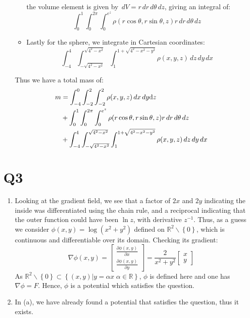 \documentclass[a4paper, 11pt]{article}
\newcommand{\RR}{\mathbb{R}}
\def\set#1{\left\{ #1 \right\}}
\begin{document}
\begin{enumerate}[label=(\alph*)]
\begin{itemize}
		            the volume element is given by $\,dV = r\,d r\,d
			            \theta \,d z$, giving an integral of:
		            \[
			            \int_0^1\int_0^{2\pi}\int_0^{e^z} \rho(r\cos\theta,r\sin\theta,z) r\,d r\,d
			            \theta \,d z
		            \]
		      \item Lastly for the sphere, we integrate in Cartesian
		            coordinates:
		            \[
			            \int_{-4}^4\int_{-\sqrt{4^2-x^2}}^{\sqrt{4^2-x^2}}\int_1^{1+\sqrt{4^2-x^2-y^2}}\rho(x,y,z) \,d z\,d y\,d x
		            \]
	      \end{itemize}
	      Thus we have a total mass of:
	      \begin{align*}
		      m & =\int_{-4}^0\int_{-2}^2\int_{-2}^2\rho(x,y,z)\,d x \,d y \text
		      d z                                                                                                             \\
		        & +\int_0^1\int_0^{2\pi}\int_0^{e^z} \rho(r\cos\theta,r\sin\theta,z) r\,d r\,d
		      \theta \,d z                                                                                                    \\
		        & +\int_{-4}^4\int_{-\sqrt{4^2-x^2}}^{\sqrt{4^2-x^2}}\int_1^{1+\sqrt{4^2-x^2-y^2}}\rho(x,y,z) \,d z\,d y\,d x
	      \end{align*}
\end{enumerate}


\section*{Q3}
\begin{enumerate}[label=(\alph*)]

	\item Looking at the gradient field,  we see that a factor of $2x$ and $2y$ indicating the inside was differentiated using the chain rule, and a reciprocal indicating that the outer function could have been $\ln z$, with derivative $z^{-1}$. Thus, as a guess we consider $\phi(x,y)=\log(x^2+y^2)$ defined on $\RR^2\backslash\set{0}$, which is continuous and differentiable over its domain. Checking its gradient:
	      \[
		      \nabla\phi(x,y)
		      =\begin{bmatrix}
			      \frac{\partial \phi(x,y)}{\partial x} \\
			      \frac{\partial \phi(x,y)}{\partial y}
		      \end{bmatrix}
		      =\frac 2{x^2+y^2}
		      \begin{bmatrix}
			      x \\y
		      \end{bmatrix}
	      \]
	      As $\RR^2\backslash\set0\subset\set{(x,y)|y=\alpha x\;\alpha\in\RR}$, $\phi$ is defined here and one has $\nabla\phi=F$. Hence, $\phi$ is a potential which satisfies the question.

	\item In (a), we have already found a potential that satisfies the question, thus it exists.

\end{enumerate}
\end{document}
